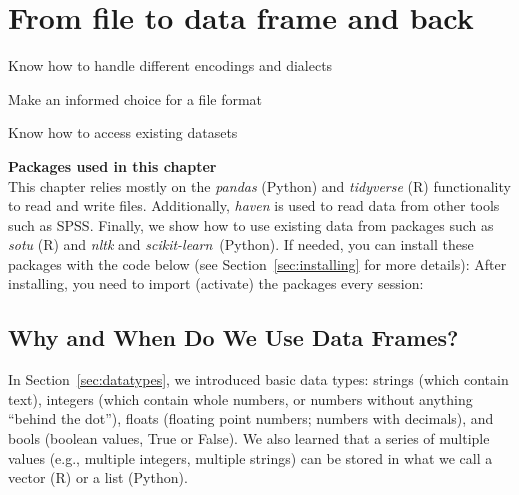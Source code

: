 \chapter{From file to data frame and back}
\label{chap:filetodata}


\begin{abstract}{Abstract}
  This chapter teaches you the basics of file handling, such as different file formats and encodings. It introduces csv files, json files, plain text files, and binary file formats. We discuss different approaches to organizing data in files, and how to write data frames to and read them from these files.  Finally, we provide guidance for retrieving example datasets.
\end{abstract}


\begin{objectives}
\item Know how to handle different encodings and dialects
\item Make an informed choice for a file format
\item Know how to access existing datasets
\end{objectives}

\begin{feature}
  \textbf{Packages used in this chapter}\\
  This chapter relies mostly on the \emph{pandas} (Python) and \emph{tidyverse} (R) functionality to read and write files. Additionally, \emph{haven} is used to read data from other tools such as SPSS.
  Finally, we show how to use existing data from packages such as \emph{sotu} (R) and \emph{nltk} and \emph{scikit-learn}\ (Python).
  If needed, you can install these packages with the code below
  (see Section~\ref{sec:installing} for more details):
  \noindent After installing, you need to import (activate) the packages every session:
\end{feature}


\section{Why and When Do We Use Data Frames?}\label{sec:dataframes}

In Section~\ref{sec:datatypes}, we introduced basic data types: strings (which contain text), integers (which contain whole numbers, or numbers without anything ``behind the dot''), floats (floating point numbers; numbers with decimals), and bools (boolean values, True or False).
We also learned that a series of multiple values (e.g., multiple integers, multiple strings) can be stored in what we call a vector (R) or a list (Python).

